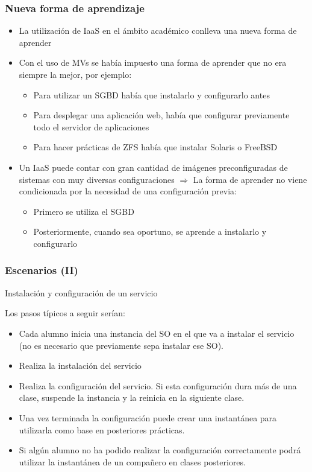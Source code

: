 \documentclass{beamer}
\begin{document}
\begin{frame}
  \frametitle{Nueva forma de aprendizaje}
  \begin{itemize}
  \item La utilización de IaaS en el ámbito académico conlleva una nueva forma
    de aprender
  \item Con el uso de MVs se había impuesto una forma de aprender que no era
    siempre la mejor, por ejemplo:
    \begin{itemize}
    \item Para utilizar un SGBD había que instalarlo y configurarlo antes
    \item Para desplegar una aplicación web, había que configurar previamente
      todo el servidor de aplicaciones
    \item Para hacer prácticas de ZFS había que instalar Solaris o FreeBSD
    \end{itemize}
    \item Un IaaS puede contar con gran cantidad de imágenes preconfiguradas de
      sistemas con muy diversas configuraciones $\Rightarrow$ La forma de
      aprender no viene condicionada por la necesidad de una configuración previa:
      \begin{itemize}
      \item Primero se utiliza el SGBD
      \item Posteriormente, cuando sea oportuno, se aprende a instalarlo y
        configurarlo
      \end{itemize}

  \end{itemize}
\end{frame}

\begin{frame}
  \frametitle{Escenarios (II)}
  \begin{description}
  \item[Instalación y configuración de un servicio]
  \end{description}
  Los pasos típicos a seguir serían:
  \begin{itemize}
  \item Cada alumno inicia una instancia del SO en el que va a instalar el
    servicio (no es necesario que previamente sepa instalar ese SO).
  \item Realiza la instalación del servicio
  \item Realiza la configuración del servicio. Si esta configuración dura
    más de una clase, suspende la instancia y la reinicia en la siguiente
    clase.
  \item Una vez terminada la configuración puede crear una instantánea para
    utilizarla como base en posteriores prácticas.
  \item Si algún alumno no ha podido realizar la configuración correctamente
    podrá utilizar la instantánea de un compañero en clases posteriores.
  \end{itemize}
\end{frame}
\end{document}
